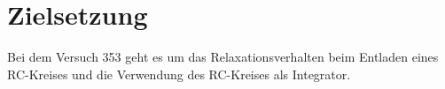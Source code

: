\section{Zielsetzung} 

\begin{flushleft}
    Bei dem Versuch 353 geht es um das Relaxationsverhalten beim Entladen eines RC-Kreises und die Verwendung des RC-Kreises als Integrator.  
\end{flushleft}


